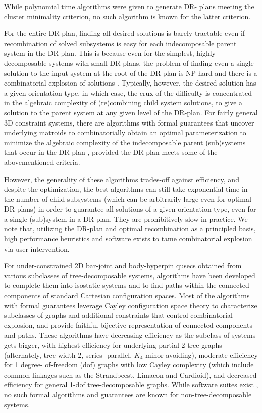 While polynomial time algorithms were given \cite{XX} to generate DR-
plans meeting the cluster minimality criterion, no such algorithm is
known for the latter criterion.


For the entire DR-plan, finding all desired solutions is barely
tractable even if recombination of solved subsystems is easy for each
indecomposable parent system in the DR-plan. This is because even for
the simplest, highly decomposable systems with small DR-plans, the
problem of finding even a single solution to the input system at the
root of the DR-plan is NP-hard \cite{XX} and there is a combinatorial
explosion of solutions \cite{XX}. Typically, however, the desired
solution has a given orientation type, in which case, the crux of the
difficulty is concentrated in the algebraic complexity of
(re)combining child system solutions, to give a solution to the parent
system at any given level of the DR-plan. For fairly general 3D
constraint systems, there are algorithms with formal guarantees that
uncover underlying matroids to combinatorially obtain an optimal
parameterization to minimize the algebraic complexity of the
indecomposable parent (sub)systems that occur in the DR-plan \cite{XX,
XX,XX}, provided the DR-plan meets some of the abovementioned
criteria.

However, the generality of these algorithms trades-off against
efficiency, and despite the optimization, the best algorithms can
still take exponential time in the number of child subsystems (which
can be arbitrarily large even for optimal DR-plans) in order to
guarantee all solutions of a given orientation type, even for a single
(sub)system in a DR-plan. They are prohibitively slow in practice. We
note that, utilizing the DR-plan and optimal recombination as a
principled basis, high performance heuristics and software exists
\cite{XX,XX} to tame combinatorial explosion via user intervention.


For under-constrained 2D bar-joint and body-hyperpin qusecs obtained
from various subclasses of tree-decomposable systems, algorithms have
been developed \cite{XX, XX} to complete them into isostatic systems
\cite{XX, XX} and to find paths within the connected components
\cite{XX,XX} of standard Cartesian configuration spaces. Most of the
algorithms with formal guarantees leverage Cayley configuration space
theory \cite{XX,XX} to characterize subclasses of graphs and
additional constraints that control combinatorial explosion, and
provide faithful bijective representation of connected components and
paths. These algorithms have decreasing efficiency as the subclass of
systems gets bigger, with highest efficiency for underlying partial
2-tree graphs (alternately, tree-width 2, series- parallel, $K_4$
minor avoiding), moderate efficiency for 1 degree- of-freedom (dof)
graphs with low Cayley complexity (which include common linkages such
as the Strandbeest, Limacon and Cardioid), and decreased efficiency
for general 1-dof tree-decomposable graphs. While software suites
exist \cite{XX,XX}, no such formal algorithms and guarantees are known
for non-tree-decomposable systems.

